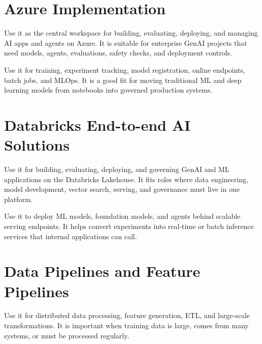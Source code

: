 \documentclass[a4paper]{article}
\begin{document}
\section{Azure Implementation}

\begin{tcolorbox}[title={Azure AI Foundry}]
Use it as the central workspace for building, evaluating, deploying, and managing AI apps and agents on Azure.
It is suitable for enterprise GenAI projects that need models, agents, evaluations, safety checks, and deployment controls.
\end{tcolorbox}

\begin{tcolorbox}[title={Azure Machine Learning}]
Use it for training, experiment tracking, model registration, online endpoints, batch jobs, and MLOps.
It is a good fit for moving traditional ML and deep learning models from notebooks into governed production systems.
\end{tcolorbox}

\section{Databricks End-to-end AI Solutions}

\begin{tcolorbox}[title={Databricks Mosaic AI}]
Use it for building, evaluating, deploying, and governing GenAI and ML applications on the Databricks Lakehouse.
It fits roles where data engineering, model development, vector search, serving, and governance must live in one platform.
\end{tcolorbox}

\begin{tcolorbox}[title={Databricks Model Serving}]
Use it to deploy ML models, foundation models, and agents behind scalable serving endpoints.
It helps convert experiments into real-time or batch inference services that internal applications can call.
\end{tcolorbox}

\section{Data Pipelines and Feature Pipelines}

\begin{tcolorbox}[title={Apache Spark on Databricks}]
Use it for distributed data processing, feature generation, ETL, and large-scale transformations.
It is important when training data is large, comes from many systems, or must be processed regularly.
\end{tcolorbox}
\end{document}
